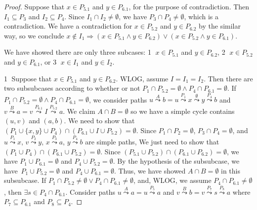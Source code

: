 \begin{proof}
    Suppose that $x \in P_{5.1}$ and $y \in P_{6.1}$, for the purpose of contradiction.
    Then $I_1 \subseteq P_3$ and $I_2 \subseteq P_4$.
    Since $I_1 \cap I_2 \neq \emptyset$, we have $P_3 \cap P_4 \neq \emptyset$,
    which is a contradiction.
    We have a contradiction for $x \in P_{5.2}$ and $y \in P_{6.2}$ by the similar way,
    so we conclude $x \notin I_1 \Longrightarrow 
    (x \in P_{5.1} \wedge y \in P_{6.2}) \vee (x \in P_{5.2} \wedge y \in P_{6.1})$.

    We have showed there are only three subcases:
    \textcircled{1} $x \in P_{5.1}$ and $y \in P_{6.2}$,
    \textcircled{2} $x \in P_{5.2}$ and $y \in P_{6.1}$,
    or \textcircled{3} $x \in I_1$ and $y \in I_2$.

    \textcircled{1} Suppose that $x \in P_{5.1}$ and $y \in P_{6.2}$.
    WLOG, assume $I = I_1 = I_2$.
    Then there are two subsubcases according to whether or not 
    $P_1 \cap P_{5.2} = \emptyset \wedge P_4 \cap P_{6.1} = \emptyset$.
    If $P_1 \cap P_{5.2} = \emptyset \wedge P_4 \cap P_{6.1} = \emptyset$,
    we consider paths $u \overset{A}{\leadsto} b = u \overset{P_1}{\leadsto} x 
    \overset{\emptyset}{\leadsto} y \overset{P_4}{\leadsto} b$ and 
    $v \overset{B}{\leadsto} a = 
    v \overset{P_{6.1}}{\leadsto} I \overset{P_{5.2}}{\leadsto} a$.
    We claim $A \cap B = \emptyset$ so we have a simple cycle contains $(u,v)$ and $(a,b)$.
    We need to show that $(P_1 \cup \{ x, y \} \cup P_4) \cap (P_{6.1} \cup I \cup P_{5.2}) = \emptyset$.
    Since $P_1 \cap P_2 = \emptyset$, $P_3 \cap P_4 = \emptyset$, 
    and $u \overset{P_1}{\leadsto} x$, $v \overset{P_2}{\leadsto} y$,
    $x \overset{P_3}{\leadsto} a$, $y \overset{P_4}{\leadsto} b$
    are simple paths,
    We just need to show that $(P_1 \cup P_4) \cap (P_{6.1} \cup P_{5.2}) = \emptyset$.
    Since $(P_{5.1} \cup P_{5.2}) \cap (P_{6.1} \cup P_{6.2}) = \emptyset$,
    we have $P_1 \cup P_{6.1} = \emptyset$ and $P_4 \cup P_{5.2} = \emptyset$.
    By the hypothesis of the subsubcase, we have\
    $P_1 \cup P_{5.2} = \emptyset$ and $P_4 \cup P_{6.1} = \emptyset$.
    Thus, we have showed $A \cap B = \emptyset$ in this subsubcase.
    If $P_1 \cap P_{5.2} \neq \emptyset \vee P_4 \cap P_{6.1} \neq \emptyset$,
    and, WLOG, we assume $P_4 \cap P_{6.1} \neq \emptyset$,
    then $\exists s \in P_4 \cap P_{6.1}$.
    Consider paths $u \overset{A}{\leadsto} a = u \overset{P_5}{\leadsto} a$
    and $v \overset{B}{\leadsto} b = 
    v \overset{P_7}{\leadsto} s \overset{P_8}{\leadsto} a$
    where $P_7 \subseteq P_{6.1}$ and $P_8 \subseteq P_4$.

\end{proof}
